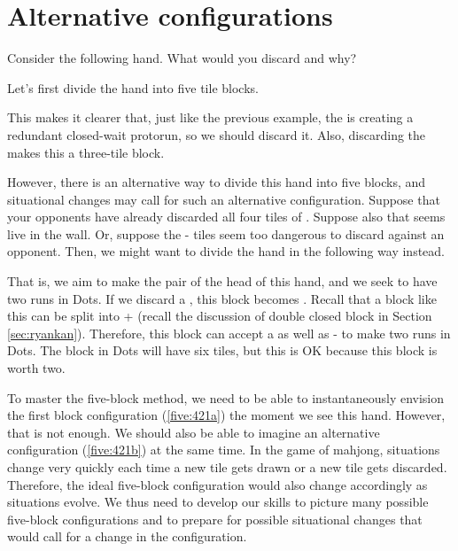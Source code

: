 \section{Alternative configurations}
Consider the following hand. What would you discard and why?

\bp
{}\zhong\zhong\zhong
\ep

Let's first divide the hand into five tile blocks. 

\emj

This makes it clearer that, just like the previous example, the {\large{}} is creating a redundant closed-wait protorun, so we should discard it. Also, discarding the {\large{}} makes this a three-tile block. 

\bigskip
However, there is an alternative way to divide this hand into five blocks, and situational changes may call for such an alternative configuration. 
Suppose that your opponents have already discarded all four tiles of {\large{}}. Suppose also that {\large{}} seems live in the wall. Or, suppose the {\large{}-} tiles seem too dangerous to discard against an opponent. Then, we might want to divide the hand in the following way instead. 

\emj

That is, we aim to make the pair of {\large{}} the head of this hand, and we seek to have two runs in Dots. If we discard a {\large{}}, this block becomes {\large{}}. 
Recall that a block like this can be split into {\large{} + } (recall the discussion of double closed block in Section \ref{sec:ryankan}). Therefore, this block can accept a {\large{}} as well as {\large{}-} to make two runs in Dots. The block in Dots will have six tiles, but this is OK because this block is worth two. 

\bigskip
To master the five-block method, we need to be able to instantaneously envision the first block configuration (\ref{five:421a}) the moment we see this hand. However, that is not enough. We should also be able to imagine an alternative configuration (\ref{five:421b}) at the same time. 
In the game of mahjong, situations change very quickly each time a new tile gets drawn or a new tile gets discarded. Therefore, the ideal five-block configuration would also change accordingly as situations evolve. We thus need to develop our skills to picture many possible five-block configurations and to prepare for possible situational changes that would call for a change in the configuration.

